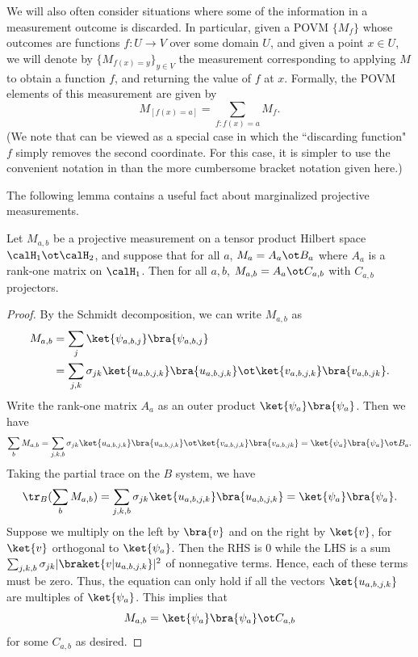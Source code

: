 \documentclass[11pt]{article}
\begin{document}
\begin{notation}\label{not:marginalize}
We will also often consider situations where some of the information
in a measurement outcome is discarded. In particular, given a
POVM $\{M_f\}$ whose outcomes are functions $f:U \to V$ over some
domain $U$, and given a point $x \in U$, we will denote by $\{M_{f(x)=
  y}\}_{y \in V}$ the measurement corresponding to applying $M$ to
obtain a function $f$, and returning the value of $f$ at
$x$. Formally, the POVM elements of this measurement are given by
\[ M_{[f(x) = a]} = \sum_{f: f(x) = a} M_f. \]
(We note that  can be viewed as a special case
in which the ``discarding function"~$f$ simply removes the second coordinate.
For this case, it is simpler to use the convenient notation in 
than the more cumbersome bracket notation given here.)
\end{notation}

The following lemma contains a useful fact about marginalized
projective measurements.
\begin{lemma}\label{lem:marginal-tensor-product}
  Let $M_{a,b}$ be a projective measurement on a tensor product
  Hilbert space $\calH_1 \ot \calH_2$, and suppose that for all $a$, $M_{a} = A_a
  \ot B_a$ where $A_a$ is a rank-one matrix on $\calH_1$. Then for all
  $a, b$, $M_{a,b} = A_a \ot C_{a,b}$ with $C_{a,b}$ projectors.
\end{lemma}
\begin{proof}
  By the Schmidt decomposition, we can write $M_{a,b}$ as
  \begin{align*}
    M_{a,b} &= \sum_j \ket{\psi_{a,b,j}}\bra{\psi_{a,b,j}} \\
    &= \sum_{j,k}  \sigma_{jk}              \ket{u_{a,b,j,k}}\bra{u_{a,b,j,k}}
      \ot\ket{v_{a,b,j,k}}\bra{v_{a,b,jk}}.
  \end{align*}
  Write the rank-one matrix $A_a$ as an outer product
  $\ket{\psi_a}\bra{\psi_a}$. Then we have
  \[ \sum_b M_{a,b} = \sum_{j,k, b} \sigma_{jk}              \ket{u_{a,b,j,k}}\bra{u_{a,b,j,k}}
      \ot\ket{v_{a,b,j,k}}\bra{v_{a,b,jk}} = 
      \ket{\psi_a}\bra{\psi_a} \ot B_a. \]
    Taking the partial trace on the $B$ system, we have
    \[  \tr_B(\sum_b M_{a,b}) = \sum_{j,k,b} \sigma_{jk}
      \ket{u_{a,b,j,k}}\bra{u_{a,b,j,k}} =
      \ket{\psi_a}\bra{\psi_a}. \]
    Suppose we multiply on the left by $\bra{v}$ and on the right by
    $\ket{v}$, for $\ket{v}$ orthogonal to $\ket{\psi_a}$. Then the
    RHS is 0 while the LHS is a sum $\sum_{j,k,b} \sigma_{jk}
    |\braket{v |u_{a,b,j,k}}|^2$ of nonnegative terms. Hence, each of
    these terms must be zero. Thus, the equation can only hold if all
    the vectors $\ket{u_{a,b,j,k}}$ are multiples of
    $\ket{\psi_a}$. This implies that
    \[ M_{a,b} = \ket{\psi_a} \bra{\psi_a} \ot C_{a,b}\]
    for some $C_{a,b}$ as desired.
\end{proof}
\end{document}
